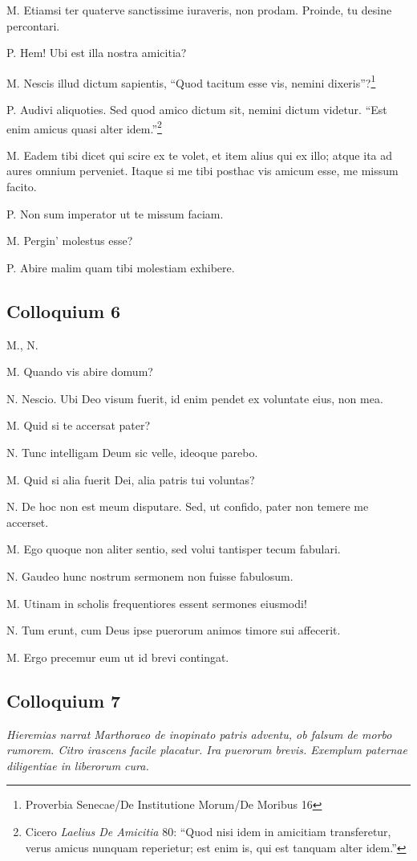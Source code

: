 \documentclass{article}
\begin{document}
M. Etiamsi ter quaterve sanctissime iuraveris, non prodam. Proinde, tu desine percontari.

P. Hem! Ubi est illa nostra amicitia?

M. Nescis illud dictum sapientis, ``Quod tacitum esse vis, nemini dixeris''?\footnote{Proverbia Senecae/De Institutione Morum/De Moribus 16}

P. Audivi aliquoties. Sed quod amico dictum sit, nemini dictum videtur. ``Est enim amicus quasi alter idem.''\footnote{Cicero \emph{Laelius De Amicitia} 80: ``Quod nisi idem in amicitiam transferetur, verus amicus nunquam reperietur; est enim is, qui est tanquam alter idem.''}

M. Eadem tibi dicet qui scire ex te volet, et item alius qui ex illo; atque ita ad aures omnium perveniet. Itaque si me tibi posthac vis amicum esse, me missum facito.

 
P. Non sum imperator ut te missum faciam.

M. Pergin' molestus esse?

P. Abire malim quam tibi molestiam exhibere.

\subsection{Colloquium 6}
M., N.

M. Quando vis abire domum?

N. Nescio. Ubi Deo visum fuerit, id enim pendet ex voluntate eius, non mea.

M. Quid si te accersat pater?

N. Tunc intelligam Deum sic velle, ideoque parebo.

M. Quid si alia fuerit Dei, alia patris tui voluntas?

N. De hoc non est meum disputare. Sed, ut confido, pater non temere me accerset.

M. Ego quoque non aliter sentio, sed volui tantisper tecum fabulari.

N. Gaudeo hunc nostrum sermonem non fuisse fabulosum.

M. Utinam in scholis frequentiores essent sermones eiusmodi!

N. Tum erunt, cum Deus ipse puerorum animos timore sui affecerit.

M. Ergo precemur eum ut id brevi contingat.

\subsection{Colloquium 7}
\emph{Hieremias narrat Marthoraeo de inopinato patris adventu, ob falsum de morbo rumorem. Citro irascens facile placatur. Ira puerorum brevis. Exemplum paternae diligentiae in liberorum cura.}
\end{document}
